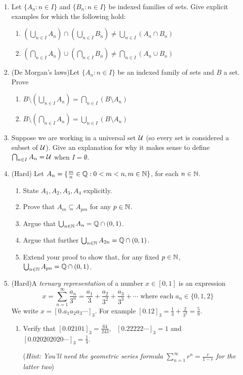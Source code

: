 \begin{exercises}{}{}
\begin{enumerate}
		
		\item Let $\{A_n:n\in I\}$ and $\{B_n:n\in I\}$ be indexed families of sets. Give explicit examples for which the following hold:
		\begin{enumerate}
	    \item $\left(\bigcup_{n\in I} A_n\right) \cap \left(\bigcup_{n\in I}B_n\right) \neq \bigcup_{n\in I} (A_n \cap B_n)$
	    \item $\left(\bigcap_{n\in I} A_n\right) \cup \left(\bigcap_{n\in I}B_n\right) \neq \bigcap_{n\in I} (A_n \cup B_n)$
		\end{enumerate}
	
		
		\item (De Morgan's laws)\lstsp Let $\{A_n:n\in I\}$ be an indexed family of sets and $B$ a set. Prove
		\begin{enumerate}
	    \item $B\setminus \left(\bigcup_{n\in I} A_n\right) = \bigcap_{n\in I} (B\setminus A_n)$
	    \item $B\setminus \left(\bigcap_{n\in I} A_n\right) = \bigcup_{n\in I}(B\setminus A_n)$
		\end{enumerate}
		
		
		\item Suppose we are working in a universal set $\mathcal{U}$ (so every set is considered a subset of $\mathcal{U}$). Give an explanation for why it makes sense to define $\bigcap_{n \in I} A_n = \mathcal{U}$ when $I = \emptyset$.
		
		\goodbreak
		
		\item (Hard) Let $A_n=\{\frac mn\in\mathbb{Q}:0<m<n, m\in \mathbb{N}\}$, for each $n\in\mathbb{N}$.
		\begin{enumerate}\itemsep1pt
			\item State $A_1,A_2,A_3,A_4$ explicitly.
			\item Prove that $A_m\subseteq A_{pm}$ for any $p\in\mathbb{N}$.
			\item Argue that $\bigcup_{n\in\mathbb{N}}A_n=\mathbb{Q}\cap (0,1)$.
			\item Argue that further $\bigcup_{n\in\mathbb{N}}A_{2n}=\mathbb{Q}\cap (0,1)$.
			\item Extend your proof to show that, for any fixed $p\in\mathbb{N}$, $\bigcup_{n\in\mathbb{N}}A_{pn}=\mathbb{Q}\cap (0,1)$.
		\end{enumerate}
		
		\goodbreak
		
			
		\item\label{exs:cantorset} (Hard)\lstsp A \emph{ternary representation}\footnotemark{} of a number $x\in[0,1]$ is an expression
		\[
			x=\sum\limits_{n=1}^\infty \frac{a_n}{3^n}=\frac{a_1}{3}+\frac{a_2}{3^2}+\frac{a_3}{3^3}+\cdots \text{ where each }a_n\in\{0,1,2\}
		\]
		We write $x=[0.a_1a_2a_3\cdots]_3$. For example $[0.12]_3=\frac 13+\frac 2{3^2}=\frac 59$.
		\begin{enumerate}
		  \item Verify that $[0.02101]_3=\frac{64}{243}$, \ $[0.22222\cdots]_3=1$ and $[0.020202020\cdots]_3=\frac 14$.\par
		  (\emph{Hint: You'll need the geometric series formula $\sum_{n=1}^\infty r^n=\frac r{1-r}$ for the latter two})
		  

\end{enumerate}
\end{enumerate}
\end{exercises}
